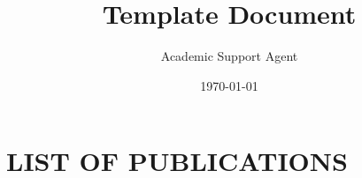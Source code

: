 \documentclass{article}
\title{Template Document}
\author{Academic Support Agent}
\date{\today}
\begin{document}
\maketitle

\setlength{\parindent}{0pt}







\renewcommand{\thesection}{\arabic{section}}%
\setcounter{page}{1}




\newpage








\newpage\mbox{}\thispagestyle{empty}\newpage



\doublespacing

\singlespacing
\newpage



\section*{LIST OF PUBLICATIONS}
\end{document}
